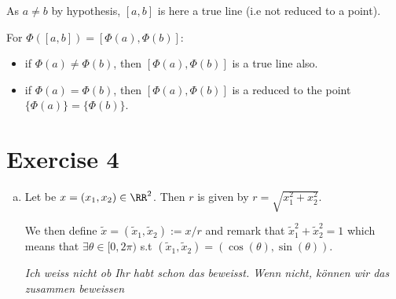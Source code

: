 As $a\neq b$ by hypothesis, $[a,b]$ is here a true line (i.e not reduced to a point).

For $\Phi([a,b])=[\Phi(a),\Phi(b)]$:

\begin{itemize}
 \item if $\Phi(a)\neq\Phi(b)$, then $[\Phi(a),\Phi(b)]$ is a true line also.
 \item if $\Phi(a)=\Phi(b)$, then $[\Phi(a), \Phi(b)]$ is a reduced to the point $\{\Phi(a)\}=\{\Phi(b)\}$.
\end{itemize}

\section{Exercise 4}

\begin{enumerate}[a)]
 \item Let be $x=(x_1,x_2)\in\RR^2$. Then $r$ is given by $r=\sqrt{x_1^2+x_2^2}$.
 
 We then define $\tilde{x}=(\tilde{x}_1,\tilde{x}_2):=x/r$ and remark that $\tilde{x}_1^2+\tilde{x}_2^2=1$ which means that $\exists \theta\in [0,2\pi)$ s.t $(\tilde{x}_1,\tilde{x}_2)=(\cos(\theta),\sin(\theta))$.
 
 \textit{Ich weiss nicht ob Ihr habt schon das beweisst. Wenn nicht, k\"onnen wir das zusammen beweissen}
\end{enumerate}
